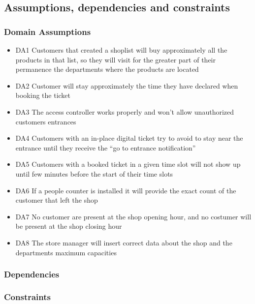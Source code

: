 \subsection{Assumptions, dependencies and constraints}
\subsubsection{Domain Assumptions}
    \begin{itemize}[label={}]
        \item DA1 Customers that created a shoplist will buy approximately all the products in that list, so they will visit for the greater part of their permanence the departments where the products are located
        \item DA2 Customer will stay approximately the time they have declared when booking the ticket
        \item DA3 The access controller works properly and won't allow unauthorized customers entrances
        \item DA4 Customers with an in-place digital ticket try to avoid to stay near the entrance until they receive the ``go to entrance notification''
        \item DA5 Customers with a booked ticket in a given time slot will not show up until few minutes before the start of their time slots
        \item DA6 If a people counter is installed it will provide the exact count of the customer that left the shop
        \item DA7 No customer are present at the shop opening hour, and no costumer will be present at the shop closing hour
        \item DA8 The store manager will insert correct data about the shop and the departments maximum capacities
    \end{itemize}
\subsubsection{Dependencies}
\subsubsection{Constraints}

